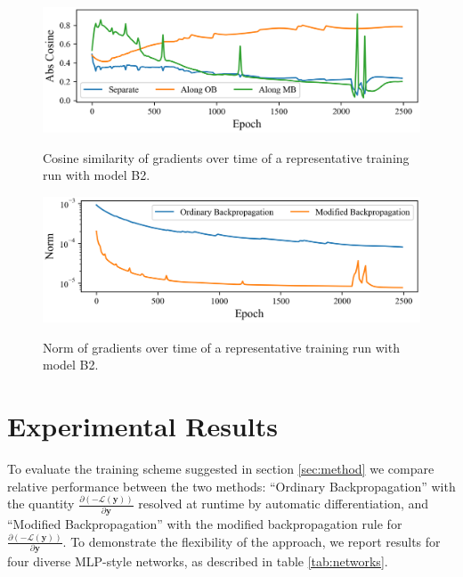 \documentclass{article}
\theoremstyle{plain}
\theoremstyle{definition}
\theoremstyle{remark}
\newcommand{\vy}{\mathbf{y}}
\newcommand{\pd}[2]{\frac{\partial{#1}}{\partial{#2}}}
\begin{document}
\begin{figure}[h]
    \centering
    \includegraphics[width=0.95\columnwidth]{./resources/cos.png}
    \label{fig:cos-b2}
    \caption{Cosine similarity of gradients over time of a representative training run with model B2.}
\end{figure}

\begin{figure}[h]
    \centering
    \includegraphics[width=0.95\columnwidth]{./resources/norm.png}
    \label{fig:norm-b2}
    \caption{Norm of gradients over time of a representative training run with model B2.}
\end{figure}

\section{Experimental Results}
\label{sec:experiment}
To evaluate the training scheme suggested in section \ref{sec:method} we compare relative performance between the two methods: ``Ordinary Backpropagation'' with the quantity $\pd{(-\mathcal{L}(\vy))}{\vy}$ resolved at runtime by automatic differentiation, and ``Modified Backpropagation'' with the modified backpropagation rule for $\pd{(-\mathcal{L}(\vy))}{\vy}$. To demonstrate the flexibility of the approach, we report results for four diverse MLP-style networks, as described in table \ref{tab:networks}.
\end{document}
